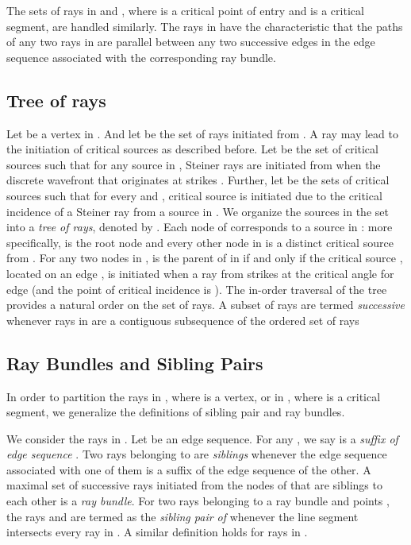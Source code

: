 \documentclass[11pt]{article}
\begin{document}
The sets of rays in  and , where  is a critical point of entry and  is a critical segment, are handled similarly.
The rays in  have the characteristic that the paths of any two rays in  are parallel between any two successive edges in the edge sequence associated with the corresponding ray bundle.

\subsection{Tree of rays}

Let  be a vertex in . And let  be the set of rays initiated from . 
A ray may lead to the initiation of critical sources as described before.
Let  be the set of critical sources such that for any source  in , Steiner rays are initiated from  when the discrete wavefront that  originates at  strikes .
Further, let  be the sets of critical sources such that for every  and , critical source  is initiated due to the critical incidence of a Steiner ray from a source in .
We organize the sources in the set  into a {\it tree of rays}, denoted by .
Each node of  corresponds to a source in :
more specifically,  is the root node and every other node in  is a distinct critical source from . 
For any two nodes  in ,  is the parent of  in  if and only if the critical source , located on an edge , is initiated when a ray from  strikes  at the critical angle for edge  (and the point of critical incidence is ). 
The in-order traversal of the tree  provides a natural order on the set of rays. 
A subset  of rays are termed {\it successive} whenever rays in  are a contiguous subsequence of the ordered set of rays

\subsection{Ray Bundles and Sibling Pairs}
In order to partition the rays in
, where  is  a vertex, or in , where  is a critical segment,
we generalize the definitions of  sibling pair and ray bundles.

We consider the rays in . 
Let  be an edge sequence.
For any , we say  is a {\it suffix of edge sequence }. 
Two rays belonging to  are {\it siblings} whenever the edge sequence associated with one of them is a suffix of the edge sequence of the other. 
A maximal set  of successive rays initiated from the nodes of  that are siblings to each other is a {\it ray bundle}.
For two rays  belonging to a ray bundle  and points , the rays  and  are termed as the {\it sibling pair of } whenever the line segment  intersects every ray in .
A similar definition holds for rays in .
 
\end{document}
